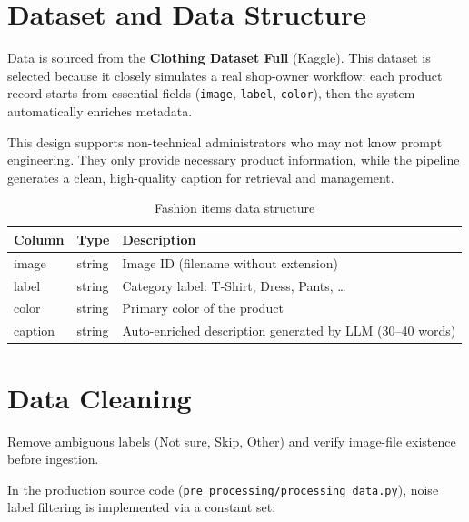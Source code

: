 \section{Dataset and Data Structure}
Data is sourced from the \textbf{Clothing Dataset Full} (Kaggle). This dataset is selected because it closely simulates a real shop-owner workflow: each product record starts from essential fields (\texttt{image}, \texttt{label}, \texttt{color}), then the system automatically enriches metadata.

This design supports non-technical administrators who may not know prompt engineering. They only provide necessary product information, while the pipeline generates a clean, high-quality caption for retrieval and management.

\begin{table}[H]
\centering
\begin{tabular}{lll}
\toprule
\textbf{Column} & \textbf{Type} & \textbf{Description}\\
\midrule
image   & string & Image ID (filename without extension)\\
label   & string & Category label: T-Shirt, Dress, Pants, \ldots\\
color   & string & Primary color of the product\\
caption & string & Auto-enriched description generated by LLM (30--40 words)\\
\bottomrule
\end{tabular}
\caption{Fashion items data structure}
\end{table}

\section{Data Cleaning}

\begin{tcolorbox}[title=Method: Noise Label Filtering and Integrity Check]
Remove ambiguous labels (Not sure, Skip, Other) and verify image-file existence before ingestion.
\end{tcolorbox}

In the production source code (\texttt{pre\_processing/processing\_data.py}), noise label filtering is implemented via a constant set:

